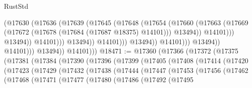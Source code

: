 \begin{lexlean}{RustStd}
\begin{coremodule}
                                              (@17630
                                                (@17636
                                                  (@17639
                                                    (@17645
                                                      (@17648
                                                        (@17654
                                                          (@17660
                                                            (@17663
                                                              (@17669
                                                                (@17672
                                                                  (@17678
                                                                    (@17684
                                                                      (@17687 @18375)
                                                                      @14101)))
                                                                @13494))
                                                            @14101)))
                                                      @13494))
                                                  @14101)))
                                            @13494))
                                        @14101)))
                                  @13494))
                              @14101)))
                        @13494))
                    @14101)))
              @13494))
          @14101)))
@18471 := @17360
    (@17366
      (@17372
        (@17375
          (@17381
            (@17384
              (@17390
                (@17396
                  (@17399
                    (@17405
                      (@17408
                        (@17414
                          (@17420
                            (@17423
                              (@17429
                                (@17432
                                  (@17438
                                    (@17444
                                      (@17447
                                        (@17453
                                          (@17456
                                            (@17462
                                              (@17468
                                                (@17471
                                                  (@17477
                                                    (@17480
                                                      (@17486
                                                        (@17492
                                                          (@17495

\end{coremodule}
\end{lexlean}
